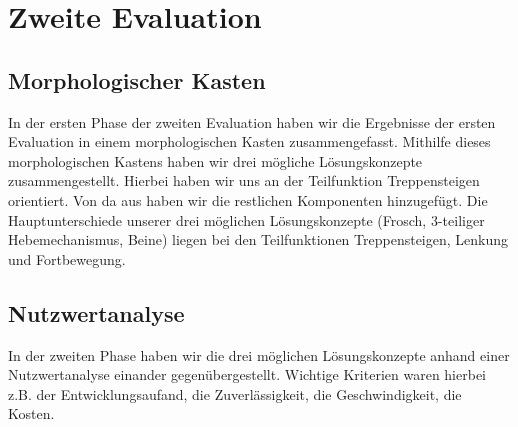 \section{Zweite Evaluation}
\subsection{Morphologischer Kasten}
In der ersten Phase der zweiten Evaluation haben wir die Ergebnisse der ersten Evaluation in einem morphologischen Kasten zusammengefasst. Mithilfe dieses morphologischen Kastens haben wir drei mögliche Lösungskonzepte zusammengestellt. Hierbei haben wir uns an der Teilfunktion Treppensteigen orientiert. Von da aus haben wir die restlichen Komponenten hinzugefügt. Die Hauptunterschiede unserer drei möglichen Lösungskonzepte (Frosch, 3-teiliger Hebemechanismus, Beine) liegen bei den Teilfunktionen Treppensteigen, Lenkung und Fortbewegung.



\subsection{Nutzwertanalyse}
In der zweiten Phase haben wir die drei möglichen Lösungskonzepte anhand einer Nutzwertanalyse einander gegenübergestellt. Wichtige Kriterien waren hierbei z.B. der Entwicklungsaufand, die Zuverlässigkeit, die Geschwindigkeit, die Kosten. 

